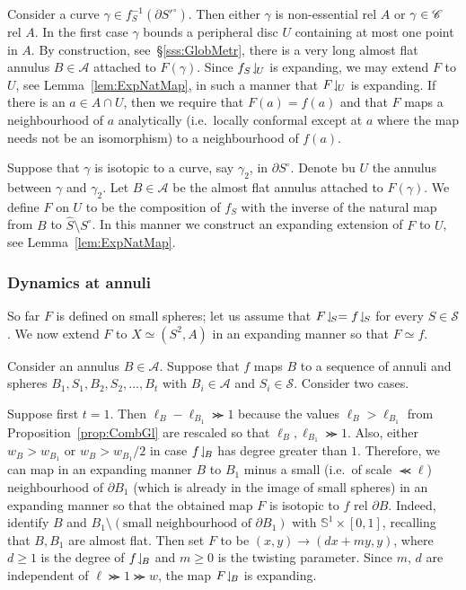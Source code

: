 \documentclass{amsart}
\newcommand\Sph{{\mathscr S}}
\newcommand\Ann{{\mathscr A}}
\begin{document}
Consider a curve $\gamma\in f_S^{-1}(\partial S'^\circ)$. Then either
$\gamma$ is non-essential rel $A$ or $\gamma \in {\mathscr C}$ rel $A$. In the first
case $\gamma$ bounds a peripheral disc $U$ containing at most one
point in $A$. By construction, see~\S\ref{sss:GlobMetr}, there is a
very long almost flat annulus $B\in \Ann$ attached to $F(\gamma)$.
Since $f_S\!\downharpoonleft_{\!U}$ is expanding, we may extend $F$ to $U$, see
Lemma~\ref{lem:ExpNatMap}, in such a manner that $F\!\downharpoonleft_{\!U}$ is
expanding. If there is an $a\in A\cap U$, then we require that
$F(a)=f(a)$ and that $F$ maps a neighbourhood of $a$ analytically
(i.e.~locally conformal except at $a$ where the map needs not be an
isomorphism) to a neighbourhood of $f(a)$.

Suppose that $\gamma$ is isotopic to a curve, say $\gamma_2$, in
$\partial S^\circ$. Denote bu $U$ the annulus between $\gamma$ and
$\gamma_2$. Let $B\in \Ann$ be the almost flat annulus attached to
$F(\gamma)$. We define $F$ on $U$ to be the composition of $f_S$ with
the inverse of the natural map from $B$ to
$\widehat S\setminus S^\circ$. In this manner we construct an
expanding extension of $F$ to $U$, see Lemma~\ref{lem:ExpNatMap}.

\subsubsection{Dynamics at annuli}
So far $F$ is defined on small spheres; let us assume that
$F\!\downharpoonleft_{\!S} =f\!\downharpoonleft_{\!S}$ for every $S\in \Sph$. We now extend $F$ to
$X\simeq (S^2,A)$ in an expanding manner so that $F\simeq f$.

Consider an annulus $B\in \Ann$. Suppose that $f$ maps $B$ to a
sequence of annuli and spheres $B_1,S_1,B_2,S_2,\dots, B_t$ with
$B_i\in \Ann$ and $S_i\in \Sph$. Consider two cases.

Suppose first $t=1$. Then $\ell_{B}-\ell_{B_1}\ggcurly 1$ because the
values $\ell_{B}> \ell_{B_1}$ from Proposition~\ref{prop:CombGl} are
rescaled so that $\ell_{B},\ell_{B_1}\ggcurly 1$. Also, either
$w_{B}>w_{B_1}$ or $w_{B}>w_{B_1}/2$ in case $f\!\downharpoonleft_{\!B}$ has degree
greater than $1$. Therefore, we can map in an expanding manner $B$ to
$B_1$ minus a small (i.e.~of scale $\llcurly \ell$) neighbourhood of
$\partial B_1$ (which is already in the image of small spheres) in an
expanding manner so that the obtained map $F$ is isotopic to $f$ rel
$\partial B$. Indeed, identify $B$ and
$B_1\setminus (\text{small neighbourhood of }\partial B_1)$ with
$\mathbb S^1\times [0,1]$, recalling that $B,B_1$ are almost
flat. Then set $F$ to be $(x,y) \to (d x +m y, y )$, where $d\ge 1$ is
the degree of $f\!\downharpoonleft_{\!B}$ and $m \ge 0$ is the twisting parameter. Since
$m$, $d$ are independent of $\ell \ggcurly 1 \ggcurly w$, the map
$F\!\downharpoonleft_{\!B}$ is expanding.
\end{document}
